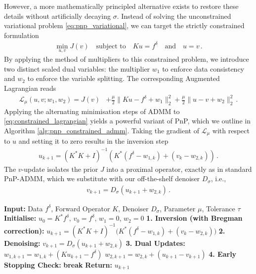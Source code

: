 However, a more mathematically principled alternative exists to restore these details without artificially decaying $\sigma$. Instead of solving the unconstrained variational problem \eqref{eq:pnp_variational}, we can target the strictly constrained formulation
\begin{align}
    \min_{u, v} J(v) \quad \text{subject to} \quad Ku = f^\delta \quad \text{and} \quad u = v \, .
    \label{eq:pnp_constrained}
\end{align}
By applying the method of multipliers to this constrained problem, we introduce two distinct scaled dual variables: the multiplier $w_1$ to enforce data consistency and $w_2$ to enforce the variable splitting. The corresponding Augmented Lagrangian reads
\begin{align}
    \mathcal{L}_\mu(u, v; w_1, w_2) = J(v) &+ \frac{\mu}{2} \| Ku - f^\delta + w_1 \|_2^2 + \frac{\mu}{2} \| u - v + w_2 \|_2^2 \, .
    \label{eq:constrained_lagrangian}
\end{align}
Applying the alternating minimisation steps of ADMM to \eqref{eq:constrained_lagrangian} yields a powerful variant of PnP, which we outline in Algorithm \ref{alg:pnp_constrained_admm}. Taking the gradient of $\mathcal{L}_\mu$ with respect to $u$ and setting it to zero results in the inversion step
\begin{align}
    u_{k+1} = (K^*K + I)^{-1} \left( K^*(f^\delta - w_{1,k}) + (v_k - w_{2,k}) \right) \, .
    \label{eq:pnp_bregman_inversion}
\end{align}
The $v$-update isolates the prior $J$ into a proximal operator, exactly as in standard PnP-ADMM, which we substitute with our off-the-shelf denoiser $D_\sigma$, i.e.,
\begin{align}
    v_{k+1} = D_\sigma(u_{k+1} + w_{2,k}) \, .
    \label{eq:pnp_bregman_denoising}
\end{align}

\begin{algorithm}
\caption{Plug-and-Play Constrained ADMM (PnP-Bregman)}
\begin{algorithmic}[1]
\State \textbf{Input:} Data $f^\delta$, Forward Operator $K$, Denoiser $D_\sigma$, Parameter $\mu$, Tolerance $\tau$
\State \textbf{Initialise:} $u_0 = K^\ast f^\delta$, $v_0 = f^\delta$, $w_1 = 0$, $w_2 = 0$
    \State
    \State \textbf{1. Inversion (with Bregman correction):}
    \State $u_{k+1} = (K^*K + I)^{-1} \big( K^*(f^\delta - w_{1,k}) + (v_k - w_{2,k}) \big)$
    \State
    \State \textbf{2. Denoising:}
    \State $v_{k+1} = D_{\sigma}(u_{k+1} + w_{2,k})$
    \State
    \State \textbf{3. Dual Updates:}
    \State $w_{1, k+1} = w_{1, k} + (K u_{k+1} - f^\delta)$
    \State $w_{2, k+1} = w_{2, k} + (u_{k+1} - v_{k+1})$
    \State
    \State \textbf{4. Early Stopping Check:}
        \State \textbf{break}
    \EndIf
\EndFor
\State \textbf{Return:} $u_{k+1}$
\end{algorithmic}\label{alg:pnp_constrained_admm}
\end{algorithm}

